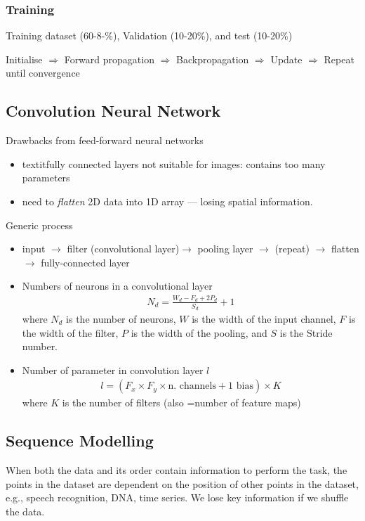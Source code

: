 \documentclass[a4paper,10pt]{article}
\begin{document}
\subsubsection{Training}
Training dataset (60-8-\%), Validation (10-20\%), and test (10-20\%)\par 

Initialise $\Rightarrow$ Forward propagation $\Rightarrow$ Backpropagation $\Rightarrow$ Update $\Rightarrow$ Repeat until convergence



\subsection{Convolution Neural Network}
Drawbacks from feed-forward neural networks 
\begin{itemize}
    \item textit{fully connected} layers not suitable for images: contains too many parameters  
    \item need to \textit{flatten} 2D data into 1D array --- losing spatial information. 
\end{itemize}

Generic process
\begin{itemize}
    \item input $\rightarrow$ filter (convolutional layer)$\rightarrow$ pooling layer $\rightarrow$ (repeat) $\rightarrow$ flatten $\rightarrow$ fully-connected layer
    \item Numbers of neurons in a convolutional layer
        \begin{gather*}
            N_d = \frac{W_d-F_d+2P_d}{S_d}+1
        \end{gather*}
    where $N_d$ is the number of neurons, $W$ is the width of the input channel, $F$ is the width of the filter, $P$ is the width of the pooling, and $S$ is the Stride number. 
    \item Number of parameter in convolution layer $l$
        \begin{gather*}
            l = (F_x\times F_y\times \text{n. channels} + 1 \text{ bias})\times K
        \end{gather*}
    where $K$ is the number of filters (also =number of feature maps)
\end{itemize}

\subsection{Sequence Modelling}
When both the data and its order contain information to perform the task, the points in the dataset are dependent on the position of other points in the dataset, e.g., speech recognition, DNA, time series. We lose key information if we shuffle the data.
\end{document}

